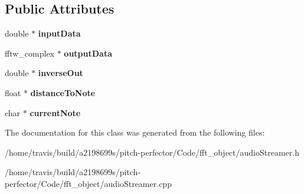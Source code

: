 \subsection*{Public Attributes}
\begin{DoxyCompactItemize}
\item 
\hypertarget{classaudioStreamer_a392bb08783c92e356e704f40ff6a109a}{double $\ast$ {\bfseries input\-Data}}\label{classaudioStreamer_a392bb08783c92e356e704f40ff6a109a}

\item 
\hypertarget{classaudioStreamer_ab44575639696ec28e58a0ca4d5e7d099}{fftw\-\_\-complex $\ast$ {\bfseries output\-Data}}\label{classaudioStreamer_ab44575639696ec28e58a0ca4d5e7d099}

\item 
\hypertarget{classaudioStreamer_a1d8289cf32dd73375172f06c998d7a9f}{double $\ast$ {\bfseries inverse\-Out}}\label{classaudioStreamer_a1d8289cf32dd73375172f06c998d7a9f}

\item 
\hypertarget{classaudioStreamer_a02267d0dc3b957a812327cd56299c459}{float $\ast$ {\bfseries distance\-To\-Note}}\label{classaudioStreamer_a02267d0dc3b957a812327cd56299c459}

\item 
\hypertarget{classaudioStreamer_a05ce3d9726f4c736652b85b94c51c33f}{char $\ast$ {\bfseries current\-Note}}\label{classaudioStreamer_a05ce3d9726f4c736652b85b94c51c33f}

\end{DoxyCompactItemize}


The documentation for this class was generated from the following files\-:\begin{DoxyCompactItemize}
\item 
/home/travis/build/a2198699s/pitch-\/perfector/\-Code/fft\-\_\-object/audio\-Streamer.\-h\item 
/home/travis/build/a2198699s/pitch-\/perfector/\-Code/fft\-\_\-object/audio\-Streamer.\-cpp\end{DoxyCompactItemize}
